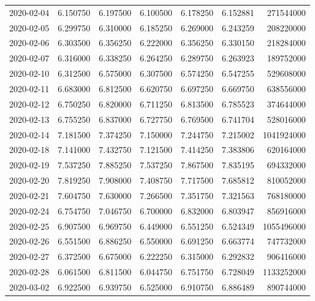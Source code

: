 \begin{tabular}{lrrrrrr}
2020-02-04 &    6.150750 &    6.197500 &    6.100500 &    6.178250 &    6.152881 &   271544000 \\
2020-02-05 &    6.299750 &    6.310000 &    6.185250 &    6.269000 &    6.243259 &   208220000 \\
2020-02-06 &    6.303500 &    6.356250 &    6.222000 &    6.356250 &    6.330150 &   218284000 \\
2020-02-07 &    6.316000 &    6.338250 &    6.264250 &    6.289750 &    6.263923 &   189752000 \\
2020-02-10 &    6.312500 &    6.575000 &    6.307500 &    6.574250 &    6.547255 &   529608000 \\
2020-02-11 &    6.683000 &    6.812500 &    6.620750 &    6.697250 &    6.669750 &   638556000 \\
2020-02-12 &    6.750250 &    6.820000 &    6.711250 &    6.813500 &    6.785523 &   374644000 \\
2020-02-13 &    6.755250 &    6.837000 &    6.727750 &    6.769500 &    6.741704 &   528016000 \\
2020-02-14 &    7.181500 &    7.374250 &    7.150000 &    7.244750 &    7.215002 &  1041924000 \\
2020-02-18 &    7.141000 &    7.432750 &    7.121500 &    7.414250 &    7.383806 &   620164000 \\
2020-02-19 &    7.537250 &    7.885250 &    7.537250 &    7.867500 &    7.835195 &   694332000 \\
2020-02-20 &    7.819250 &    7.908000 &    7.408750 &    7.717500 &    7.685812 &   810052000 \\
2020-02-21 &    7.604750 &    7.630000 &    7.266500 &    7.351750 &    7.321563 &   768180000 \\
2020-02-24 &    6.754750 &    7.046750 &    6.700000 &    6.832000 &    6.803947 &   856916000 \\
2020-02-25 &    6.907500 &    6.969750 &    6.449000 &    6.551250 &    6.524349 &  1055496000 \\
2020-02-26 &    6.551500 &    6.886250 &    6.550000 &    6.691250 &    6.663774 &   747732000 \\
2020-02-27 &    6.372500 &    6.675000 &    6.222250 &    6.315000 &    6.292832 &   906416000 \\
2020-02-28 &    6.061500 &    6.811500 &    6.044750 &    6.751750 &    6.728049 &  1133252000 \\
2020-03-02 &    6.922500 &    6.939750 &    6.525000 &    6.910750 &    6.886489 &   890744000 \\

\end{tabular}

